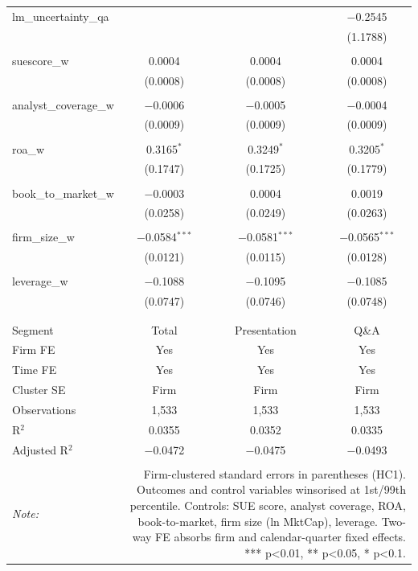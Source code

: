 \begin{table}[!htbp]
\begin{tabular}{@{\extracolsep{5pt}}lccc}
 lm\_uncertainty\_qa &  &  & $-$0.2545 \\ 
  &  &  & (1.1788) \\ 
  & & & \\ 
 suescore\_w & 0.0004 & 0.0004 & 0.0004 \\ 
  & (0.0008) & (0.0008) & (0.0008) \\ 
  & & & \\ 
 analyst\_coverage\_w & $-$0.0006 & $-$0.0005 & $-$0.0004 \\ 
  & (0.0009) & (0.0009) & (0.0009) \\ 
  & & & \\ 
 roa\_w & 0.3165$^{*}$ & 0.3249$^{*}$ & 0.3205$^{*}$ \\ 
  & (0.1747) & (0.1725) & (0.1779) \\ 
  & & & \\ 
 book\_to\_market\_w & $-$0.0003 & 0.0004 & 0.0019 \\ 
  & (0.0258) & (0.0249) & (0.0263) \\ 
  & & & \\ 
 firm\_size\_w & $-$0.0584$^{***}$ & $-$0.0581$^{***}$ & $-$0.0565$^{***}$ \\ 
  & (0.0121) & (0.0115) & (0.0128) \\ 
  & & & \\ 
 leverage\_w & $-$0.1088 & $-$0.1095 & $-$0.1085 \\ 
  & (0.0747) & (0.0746) & (0.0748) \\ 
  & & & \\ 
\hline \\[-1.8ex] 
Segment & Total & Presentation & Q\&A \\ 
Firm FE & Yes & Yes & Yes \\ 
Time FE & Yes & Yes & Yes \\ 
Cluster SE & Firm & Firm & Firm \\ 
Observations & 1,533 & 1,533 & 1,533 \\ 
R$^{2}$ & 0.0355 & 0.0352 & 0.0335 \\ 
Adjusted R$^{2}$ & $-$0.0472 & $-$0.0475 & $-$0.0493 \\ 
\hline 
\hline \\[-1.8ex] 
\textit{Note:}  & \multicolumn{3}{r}{Firm-clustered standard errors in parentheses (HC1). Outcomes and control variables winsorised at 1st/99th percentile. Controls: SUE score, analyst coverage, ROA, book-to-market, firm size (ln MktCap), leverage. Two-way FE absorbs firm and calendar-quarter fixed effects. *** p<0.01, ** p<0.05, * p<0.1.} \\ 
\end{tabular} 
\end{table} 
